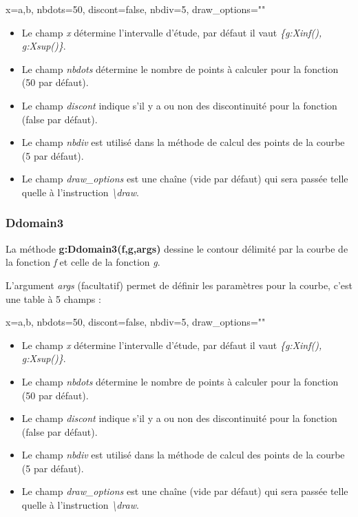 \documentclass[%
10pt,%
a4paper,%
french,%
]%
{article}%
\begin{document}
\begin{TeXcode}
    { x={a,b}, nbdots=50, discont=false, nbdiv=5, draw_options="" }
\end{TeXcode}

\begin{itemize}
  \item Le champ \emph{x} détermine l'intervalle d'étude, par défaut il vaut \emph{\{g:Xinf(), g:Xsup()\}}.
  \item Le champ \emph{nbdots} détermine le nombre de points à calculer pour la fonction (50 par défaut).
  \item Le champ \emph{discont} indique s'il y a ou non des discontinuité pour la fonction (false par défaut).
  \item Le champ \emph{nbdiv} est utilisé dans la méthode de calcul des points de la courbe (5 par défaut).
  \item Le champ \emph{draw\_options} est une chaîne (vide par défaut) qui sera passée telle quelle à l'instruction \emph{\textbackslash draw}.
\end{itemize}
  
\subsubsection{Ddomain3}

La méthode \textbf{g:Ddomain3(f,g,args)} dessine le contour délimité par la courbe de la fonction \emph{f} et celle de la fonction \emph{g}.

L'argument \emph{args} (facultatif) permet de définir les paramètres pour la courbe, c'est une table à 5 champs : 

\begin{TeXcode}
    { x={a,b}, nbdots=50, discont=false, nbdiv=5, draw_options="" }
\end{TeXcode}

\begin{itemize}
  \item Le champ \emph{x} détermine l'intervalle d'étude, par défaut il vaut \emph{\{g:Xinf(), g:Xsup()\}}.
  \item Le champ \emph{nbdots} détermine le nombre de points à calculer pour la fonction (50 par défaut).
  \item Le champ \emph{discont} indique s'il y a ou non des discontinuité pour la fonction (false par défaut).
  \item Le champ \emph{nbdiv} est utilisé dans la méthode de calcul des points de la courbe (5 par défaut).
  \item Le champ \emph{draw\_options} est une chaîne (vide par défaut) qui sera passée telle quelle à l'instruction \emph{\textbackslash draw}.
\end{itemize}
\end{document}
